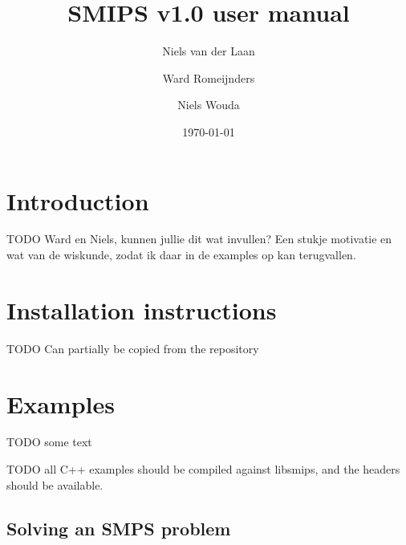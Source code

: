 \documentclass[12pt, english]{article}
\title{SMIPS v1.0 user manual}
\author{
	Niels van der Laan
	\and
	Ward Romeijnders
	\and
	Niels Wouda
}
\date{\today}
\begin{document}
	
\maketitle
\tableofcontents

\section{Introduction}
\label{sec:introduction}

TODO Ward en Niels, kunnen jullie dit wat invullen? Een stukje motivatie en wat van de wiskunde, zodat ik daar in de examples op kan terugvallen.

\section{Installation instructions}
\label{sec:installation_instructions}

TODO Can partially be copied from the repository

\section{Examples}
\label{sec:examples}

TODO some text

TODO all C++ examples should be compiled against libsmips, and the headers should be available.

\subsection{Solving an SMPS problem}
\label{subsec:solving_smps_example}
\end{document}

